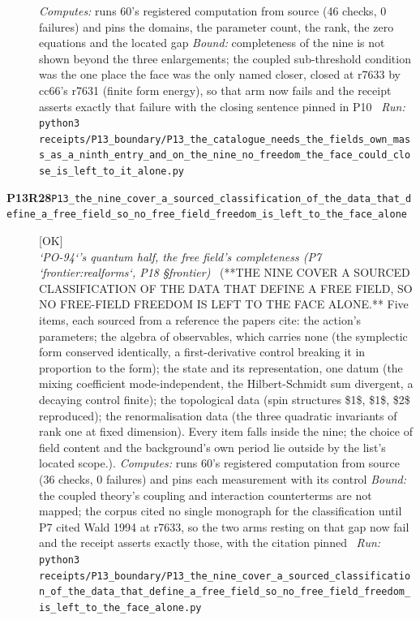 \begin{description}
\emph{Computes:} runs 60's registered computation from source (46 checks, 0 failures) and pins the domains, the parameter count, the rank, the zero equations and the located gap
 \emph{Bound:} completeness of the nine is not shown beyond the three enlargements; the coupled sub-threshold condition was the one place the face was the only named closer, closed at r7633 by cc66's r7631 (finite form energy), so that arm now fails and the receipt asserts exactly that failure with the closing sentence pinned in P10
\ \emph{Run:} \texttt{python3 receipts/P13\_boundary/P13\_the\_catalogue\_needs\_the\_fields\_own\_mass\_as\_a\_ninth\_entry\_and\_on\_the\_nine\_no\_freedom\_the\_face\_could\_close\_is\_left\_to\_it\_alone.py}
\item[\rcptlabel{P13_the_nine_cover_a_sourced_classification_of_the_data_that_define_a_free_field_so_no_free_field_freedom_is_left_to_the_face_alone}{P13R28}\textbf{P13R28}\quad\texttt{P13\_the\_nine\_cover\_a\_sourced\_classification\_of\_the\_data\_that\_define\_a\_free\_field\_so\_no\_free\_field\_freedom\_is\_left\_to\_the\_face\_alone}]\hfill\textsf{[OK]}\\
\textit{`PO-94`'s quantum half, the free field's completeness (P7 `frontier:realforms`, P18 \S{}frontier)} \ (**THE NINE COVER A SOURCED CLASSIFICATION OF THE DATA THAT DEFINE A FREE FIELD, SO NO FREE-FIELD FREEDOM IS LEFT TO THE FACE ALONE.** Five items, each sourced from a reference the papers cite: the action's parameters; the algebra of observables, which carries none (the symplectic form conserved identically, a first-derivative control breaking it in proportion to the form); the state and its representation, one datum (the mixing coefficient mode-independent, the Hilbert-Schmidt sum divergent, a decaying control finite); the topological data (spin structures \$1\$, \$1\$, \$2\$ reproduced); the renormalisation data (the three quadratic invariants of rank one at fixed dimension). Every item falls inside the nine; the choice of field content and the background's own period lie outside by the list's located scope.). 
\emph{Computes:} runs 60's registered computation from source (36 checks, 0 failures) and pins each measurement with its control
 \emph{Bound:} the coupled theory's coupling and interaction counterterms are not mapped; the corpus cited no single monograph for the classification until P7 cited Wald 1994 at r7633, so the two arms resting on that gap now fail and the receipt asserts exactly those, with the citation pinned
\ \emph{Run:} \texttt{python3 receipts/P13\_boundary/P13\_the\_nine\_cover\_a\_sourced\_classification\_of\_the\_data\_that\_define\_a\_free\_field\_so\_no\_free\_field\_freedom\_is\_left\_to\_the\_face\_alone.py}

\end{description}
